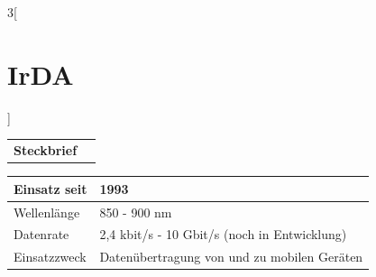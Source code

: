%
%

\begin{multicols}{3}[\section{IrDA}]


\newrefsegment

\begin{boxedminipage}{\linewidth}
\begin{tabular}{p{}p{2.7 cm}}
\textbf{Steckbrief}& \\
\end{tabular}
\begin{tabular}{p{}|p{2.7 cm}}
      Einsatz seit & 1993\\
      \hline
      Wellenlänge  & 850 - 900 nm\\
      \hline
      Datenrate & 2,4 kbit/s - 10 Gbit/s (noch in Entwicklung) \\
      \hline
      Einsatzzweck & Datenübertragung von und zu mobilen Geräten \\
\end{tabular}
\end{boxedminipage}
\par

\end{multicols}
